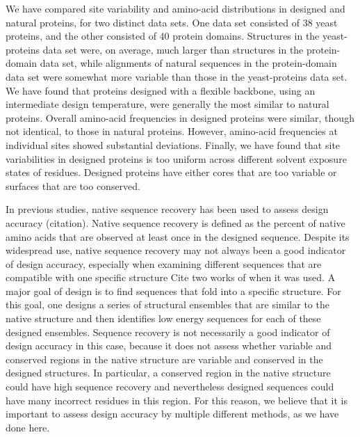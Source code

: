\documentclass[12pt]{article}
\begin{document}
We have compared site variability and amino-acid distributions in designed and natural proteins, for two distinct data sets. One data set consisted of 38 yeast proteins, and the other consisted of 40 protein domains. Structures in the yeast-proteins data set were, on average, much larger than structures in the protein-domain data set, while alignments of natural sequences in the protein-domain data set were somewhat more variable than those in the yeast-proteins data set. We have found that proteins designed with a flexible backbone, using an intermediate design temperature, were generally the most similar to natural proteins. Overall amino-acid frequencies in designed proteins were similar, though not identical, to those in natural proteins. However, amino-acid frequencies at individual sites showed substantial deviations. Finally, we have found that site variabilities in designed proteins is too uniform across different solvent exposure states of residues. Designed proteins have either cores that are too variable or surfaces that are too conserved.

In previous studies, native sequence recovery has been used to assess design accuracy {\color{red}(citation)}. Native sequence recovery is defined as the percent of native amino acids that are observed at least once in the designed sequence. Despite its widespread use, native sequence recovery may not always been a good indicator of design accuracy, especially when examining different sequences that are compatible with one specific structure {\color{red}Cite two works of when it was used}. A major goal of design is to find sequences that fold into a specific structure. For this goal, one designs a series of structural ensembles that are similar to the native structure and then identifies low energy sequences for each of these designed ensembles. Sequence recovery is not necessarily a good indicator of design accuracy in this case, because it does not assess whether variable and conserved regions in the native structure are variable and conserved in the designed structures. In particular, a conserved region in the native structure could have high sequence recovery and nevertheless designed sequences could have many incorrect residues in this region. For this reason, we believe that it is important to assess design accuracy by multiple different methods, as we have done here.
\end{document}
